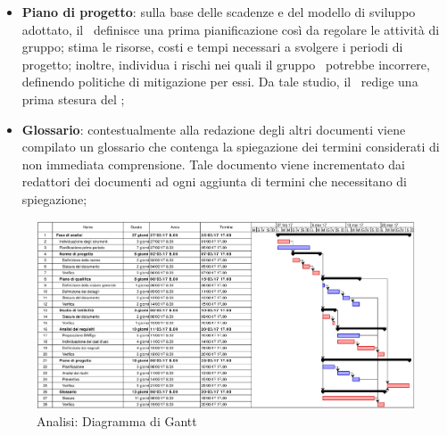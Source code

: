 \documentclass[../PianoDiProgetto.tex]{subfiles}
\begin{document}
\begin{itemize}
			\item \textbf{Piano di progetto}: sulla base delle scadenze e del modello di sviluppo adottato, il \responsabilediprogetto\ definisce una prima pianificazione così da regolare le attività di gruppo; stima le risorse, costi e tempi necessari a svolgere i periodi di progetto; inoltre, individua i rischi nei quali il gruppo \kaleidoscode\ potrebbe incorrere, definendo politiche di mitigazione per essi. Da tale studio, il \responsabilediprogetto\ redige una prima stesura del \pianodiprogetto;
			
			\item \textbf{Glossario}: contestualmente alla redazione degli altri documenti viene compilato un glossario che contenga la spiegazione dei termini considerati di non immediata comprensione. Tale documento viene incrementato dai redattori dei documenti ad ogni aggiunta di termini che necessitano di spiegazione;
			

		\end{itemize}
		\begin{figure}[H]
			\centering
			\includegraphics[scale=0.55]{Figures/Gantt_Analisi.jpg}
			\caption{Analisi: Diagramma di Gantt}
		\end{figure}
			
			
			
\end{document}
